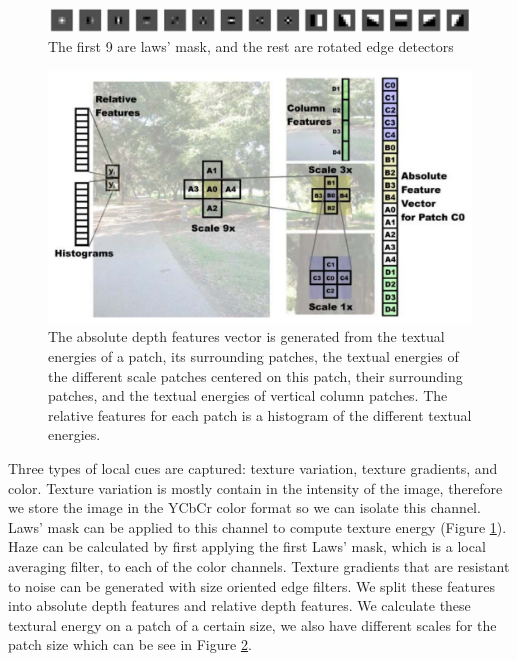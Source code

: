 \documentclass[journal]{IEEEtran}
\begin{document}
\begin{figure}[!t]
\includegraphics[width=\linewidth]{lawsmask.PNG}
\caption{The first 9 are laws' mask, and the rest are rotated edge detectors}
\label{fig:lawsmask}
\end{figure}

\begin{figure}[!t]
\includegraphics[width=\linewidth]{Features.PNG}
\caption{The absolute depth features vector is generated from the textual energies of a patch, its surrounding patches, the textual energies of the different scale patches centered on this patch, their surrounding patches, and the textual energies of vertical column patches. The relative features for each patch is a histogram of the different textual energies.}
\label{fig:featureimage}
\end{figure}

Three types of local cues are captured: texture variation, texture gradients, and color. Texture variation is mostly contain in the intensity of the image, therefore we store the image in the YCbCr color format so we can isolate this channel. Laws' mask \cite{davies04, michels05} can be applied to this channel to compute texture energy (Figure \ref{fig:lawsmask}). Haze can be calculated by first applying the first Laws' mask, which is a local averaging filter, to each of the color channels. Texture gradients that are resistant to noise can be generated with size oriented edge filters. We split these features into absolute depth features and relative depth features. We calculate these textural energy on a patch of a certain size, we also have different scales for the patch size which can be see in Figure \ref{fig:featureimage}.
\end{document}
